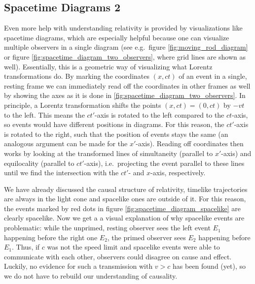 		\subsection{Spacetime Diagrams 2}
Even more help with understanding relativity is provided by visualizations like spacetime diagrams, which are especially helpful because one can visualize multiple observers in a single diagram (see e.g.~figure \ref{fig:moving_rod_diagram} or figure \ref{fig:spacetime_diagram_two_observers}, where grid lines are shown as well). Essentially, this is a geometric way of visualizing what Lorentz transformations do. By marking the coordinates $(x, ct)$ of an event in a single, resting frame we can immediately read off the coordinates in other frames as well by showing the axes as it is done in \ref{fig:spacetime_diagram_two_observers}. In principle, a Lorentz transformation shifts the points $(x, ct) = (0, ct)$ by $-vt$ to the left. This means the $ct'$-axis is rotated to the left compared to the $ct$-axis, so events would have different positions in diagrams. For this reason, the $ct'$-axis is rotated to the right, such that the position of events stays the same (an analogous argument can be made for the $x'$-axis). Reading off coordinates then works by looking at the transformed lines of simultaneity (parallel to $x'$-axis) and equilocality (parallel to $ct'$-axis), i.e.~projecting the event parallel to these lines until we find the intersection with the $ct'$- and $x$-axis, respectively.




We have already discussed the causal structure of relativity, timelike trajectories are always in the light cone and spacelike ones are outside of it. For this reason, the events marked by red dots in figure \ref{fig:spacetime_diagram_spacelike} are clearly spacelike. Now we get a a visual explanation of why spacelike events are problematic: while the unprimed, resting observer sees the left event $E_1$ happening before the right one $E_2$, the primed observer sees $E_2$ happening before $E_1$. Thus, if $c$ was not the speed limit and spacelike events were able to communicate with each other, observers could disagree on cause and effect. Luckily, no evidence for such a transmission with $v > c$ has been found (yet), so we do not have to rebuild our understanding of causality.\\



